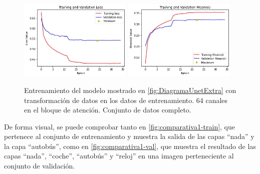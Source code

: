 \begin{figure}[h!]
  \centering
  \includegraphics[width=0.48\textwidth]{../../modelos-entrenados/unet-conv/ejecucion12/loss}
  \includegraphics[width=0.48\textwidth]{../../modelos-entrenados/unet-conv/ejecucion12/iou}
  \caption{Entrenamiento del modelo mostrado en \autoref{fig:DiagramaUnetExtra} con transformación de datos en los datos de entrenamiento. $64$ canales en el bloque de atención. Conjunto de datos completo.}
  \label{fig:ejec12}
\end{figure}

\newpage
De forma visual, se puede comprobar tanto en \autoref{fig:comparativa1-train}, que pertenece al conjunto de entrenamiento y muestra la salida de las capas ``nada'' y la capa ``autobús'', como en \autoref{fig:comparativa1-val}, que muestra el resultado de las capas ``nada'', ``coche'', ``autobús'' y ``reloj'' en una imagen perteneciente al conjunto de validación.\\

